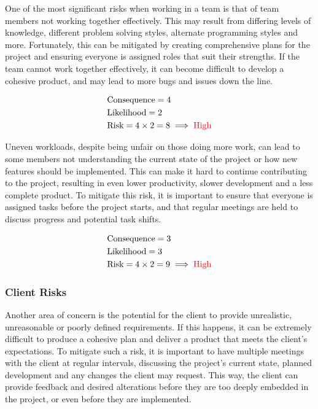 \documentclass[11pt, a4paper]{article}
\begin{document}
\noindent One of the most significant risks when working in a team is that of team members not working together effectively. This may result from differing levels of knowledge, different problem solving styles, alternate programming styles and more. Fortunately, this can be mitigated by creating comprehensive plans for the project and ensuring everyone is assigned roles that suit their strengths. If the team cannot work together effectively, it can become difficult to develop a cohesive product, and may lead to more bugs and issues down the line.

\begin{equation*}
    \begin{aligned}
         & \text{Consequence}=4                                     \\
         & \text{Likelihood}=2                                      \\
         & \text{Risk}=4\times2=8 \implies {\color{red}\text{High}}
    \end{aligned}
\end{equation*}

\noindent Uneven workloads, despite being unfair on those doing more work, can lead to some members not understanding the current state of the project or how new features should be implemented. This can make it hard to continue contributing to the project, resulting in even lower productivity, slower development and a less complete product. To mitigate this risk, it is important to ensure that everyone is assigned tasks before the project starts, and that regular meetings are held to discuss progress and potential task shifts.

\begin{equation*}
    \begin{aligned}
         & \text{Consequence}=3                                     \\
         & \text{Likelihood}=3                                      \\
         & \text{Risk}=4\times2=9 \implies {\color{red}\text{High}}
    \end{aligned}
\end{equation*}

\subsubsection{Client Risks}

\noindent Another area of concern is the potential for the client to provide unrealistic, unreasonable or poorly defined requirements. If this happens, it can be extremely difficult to produce a cohesive plan and deliver a product that meets the client's expectations. To mitigate such a risk, it is important to have multiple meetings with the client at regular intervals, discussing the project's current state, planned development and any changes the client may request. This way, the client can provide feedback and desired alterations before they are too deeply embedded in the project, or even before they are implemented.
\end{document}
